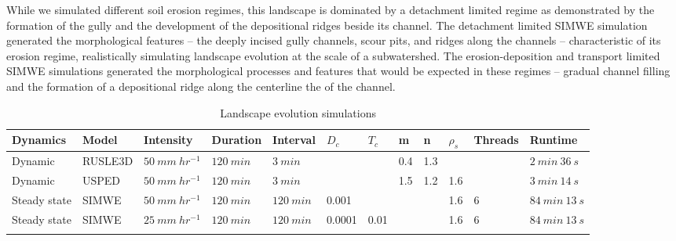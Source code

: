 \documentclass[esurf, manuscript]{copernicus}
\begin{document}
While we simulated different soil erosion regimes, 
this landscape is dominated by a detachment limited regime
as demonstrated by the formation of the gully
and the development of the depositional ridges 
beside its channel. 
% 
The detachment limited SIMWE simulation 
generated the morphological features
-- the deeply incised gully channels, 
scour pits,
and ridges along the channels 
--
characteristic of its erosion regime,
realistically simulating landscape evolution 
at the scale of a subwatershed. 
%
The erosion-deposition and transport limited 
SIMWE simulations generated 
the morphological processes and features
that would be expected in these regimes
-- gradual channel filling 
and the formation of a depositional ridge 
along the centerline the of the channel.





\begin{table}
\small
\caption{Landscape evolution simulations}
\begin{tabu} to \textwidth {XXXXXllllllX}
\toprule
Dynamics & Model & Intensity & Duration & Interval & $D_c$ & $T_c$ & m & n & $\rho_s$ & Threads & Runtime\\
\midrule
Dynamic & RUSLE3D & $50~mm~hr^{-1}$ & $120~min$ & $3~min$ &  &  & 0.4 & 1.3 & & & $2~min~36~s$\\
Dynamic & USPED & $50~mm~hr^{-1}$ & $120~min$ & $3~min$ &  &  & 1.5 & 1.2 & 1.6 & & $3~min~14~s$\\
Steady state & SIMWE & $50~mm~hr^{-1}$ & $120~min$ & $120~min$ & 0.001 & & & & 1.6 & 6 & $84~min~13~s$\\
Steady state & SIMWE & $25~mm~hr^{-1}$ & $120~min$ & $120~min$ & 0.0001 & 0.01 & & & 1.6 & 6 & $84~min~13~s$\\
\bottomrule
\\
\end{tabu}
\label{table:simulations} 
\end{table}

\end{document}
